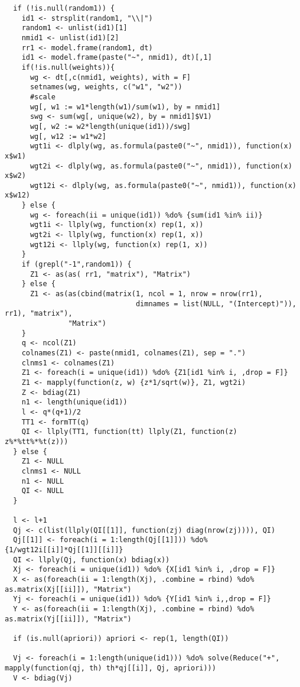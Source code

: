 \documentclass[11pt,a4paper]{article}
\begin{document}
\begin{appendix}
\begin{footnotesize}
\begin{verbatim}
  if (!is.null(random1)) {
    id1 <- strsplit(random1, "\\|")
    random1 <- unlist(id1)[1]
    nmid1 <- unlist(id1)[2]
    rr1 <- model.frame(random1, dt)
    id1 <- model.frame(paste("~", nmid1), dt)[,1]
    if(!is.null(weights)){
      wg <- dt[,c(nmid1, weights), with = F]
      setnames(wg, weights, c("w1", "w2"))
      #scale
      wg[, w1 := w1*length(w1)/sum(w1), by = nmid1]
      swg <- sum(wg[, unique(w2), by = nmid1]$V1)
      wg[, w2 := w2*length(unique(id1))/swg]
      wg[, w12 := w1*w2]
      wgt1i <- dlply(wg, as.formula(paste0("~", nmid1)), function(x) x$w1)
      wgt2i <- dlply(wg, as.formula(paste0("~", nmid1)), function(x) x$w2)
      wgt12i <- dlply(wg, as.formula(paste0("~", nmid1)), function(x) x$w12)
    } else {
      wg <- foreach(ii = unique(id1)) %do% {sum(id1 %in% ii)}
      wgt1i <- llply(wg, function(x) rep(1, x))
      wgt2i <- llply(wg, function(x) rep(1, x))
      wgt12i <- llply(wg, function(x) rep(1, x))
    }
    if (grepl("-1",random1)) {
      Z1 <- as(as( rr1, "matrix"), "Matrix")
    } else {
      Z1 <- as(as(cbind(matrix(1, ncol = 1, nrow = nrow(rr1),
                               dimnames = list(NULL, "(Intercept)")), rr1), "matrix"),
               "Matrix")
    }
    q <- ncol(Z1)
    colnames(Z1) <- paste(nmid1, colnames(Z1), sep = ".")
    clnms1 <- colnames(Z1)
    Z1 <- foreach(i = unique(id1)) %do% {Z1[id1 %in% i, ,drop = F]}
    Z1 <- mapply(function(z, w) {z*1/sqrt(w)}, Z1, wgt2i)
    Z <- bdiag(Z1)
    n1 <- length(unique(id1))
    l <- q*(q+1)/2
    TT1 <- formTT(q)
    QI <- llply(TT1, function(tt) llply(Z1, function(z) z%*%tt%*%t(z)))
  } else {
    Z1 <- NULL
    clnms1 <- NULL
    n1 <- NULL
    QI <- NULL
  }
  
  l <- l+1
  Qj <- c(list(llply(QI[[1]], function(zj) diag(nrow(zj)))), QI)
  Qj[[1]] <- foreach(i = 1:length(Qj[[1]])) %do% {1/wgt12i[[i]]*Qj[[1]][[i]]}
  QI <- llply(Qj, function(x) bdiag(x))
  Xj <- foreach(i = unique(id1)) %do% {X[id1 %in% i, ,drop = F]}
  X <- as(foreach(ii = 1:length(Xj), .combine = rbind) %do% as.matrix(Xj[[ii]]), "Matrix")
  Yj <- foreach(i = unique(id1)) %do% {Y[id1 %in% i,,drop = F]}
  Y <- as(foreach(ii = 1:length(Xj), .combine = rbind) %do% as.matrix(Yj[[ii]]), "Matrix")
  
  if (is.null(apriori)) apriori <- rep(1, length(QI))
  
  Vj <- foreach(i = 1:length(unique(id1))) %do% solve(Reduce("+", mapply(function(qj, th) th*qj[[i]], Qj, apriori)))
  V <- bdiag(Vj)
  

\end{verbatim}
\end{footnotesize}
\end{appendix}
\end{document}
